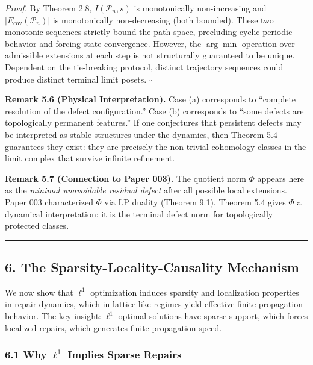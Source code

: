 \documentclass[
]{article}
\begin{document}
\emph{Proof.} By Theorem 2.8, \(I(\mathcal{P}_n, s)\) is monotonically
non-increasing and \(|E_{\text{cov}}(\mathcal{P}_n)|\) is monotonically
non-decreasing (both bounded). These two monotonic sequences strictly
bound the path space, precluding cyclic periodic behavior and forcing
state convergence. However, the \(\arg\min\) operation over admissible
extensions at each step is not structurally guaranteed to be unique.
Dependent on the tie-breaking protocol, distinct trajectory sequences
could produce distinct terminal limit posets. \(\square\)

\textbf{Remark 5.6 (Physical Interpretation).} Case (a) corresponds to
``complete resolution of the defect configuration.'' Case (b)
corresponds to ``some defects are topologically permanent features.'' If
one conjectures that persistent defects may be interpreted as stable
structures under the dynamics, then Theorem 5.4 guarantees they exist:
they are precisely the non-trivial cohomology classes in the limit
complex that survive infinite refinement.

\textbf{Remark 5.7 (Connection to Paper 003).} The quotient norm
\(\Phi\) appears here as the \emph{minimal unavoidable residual defect}
after all possible local extensions. Paper 003 characterized \(\Phi\)
via LP duality (Theorem 9.1). Theorem 5.4 gives \(\Phi\) a dynamical
interpretation: it is the terminal defect norm for topologically
protected classes.

\begin{center}\rule{0.5\linewidth}{0.5pt}\end{center}

\subsection{6. The Sparsity-Locality-Causality
Mechanism}\label{the-sparsity-locality-causality-mechanism}

We now show that \(\ell^1\) optimization induces sparsity and
localization properties in repair dynamics, which in lattice-like
regimes yield effective finite propagation behavior. The key insight:
\(\ell^1\) optimal solutions have sparse support, which forces localized
repairs, which generates finite propagation speed.

\subsubsection{\texorpdfstring{6.1 Why \(\ell^1\) Implies Sparse
Repairs}{6.1 Why \textbackslash ell\^{}1 Implies Sparse Repairs}}\label{why-ell1-implies-sparse-repairs}
\end{document}
